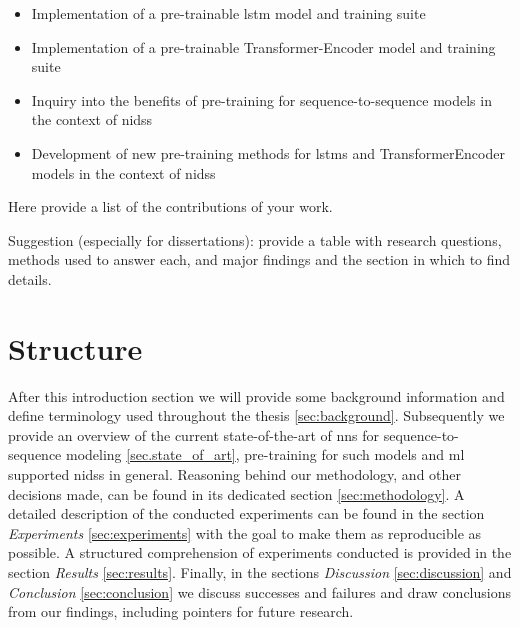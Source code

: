 \begin{itemize}
	\item Implementation of a pre-trainable \gls{lstm} model and training suite
	\item Implementation of a pre-trainable Transformer-Encoder model and training suite
	\item Inquiry into the benefits of pre-training for sequence-to-sequence models in the context of \glspl{nids}
	\item Development of new pre-training methods for \glspl{lstm} and TransformerEncoder models in the context of \glspl{nids}
\end{itemize}

Here provide a list of the contributions of your work.

Suggestion (especially for dissertations): provide a table with research questions, methods used to answer each, and major findings and the section in which to find details.

\section{Structure} \label{sect.structure}

After this introduction section we will provide some background information and define terminology used throughout the thesis \ref{sec:background}. Subsequently we provide an overview of the current state-of-the-art of \glspl{nn} for sequence-to-sequence modeling \ref{sec.state_of_art}, pre-training for such models and \gls{ml} supported \glspl{nids} in general. Reasoning behind our methodology, and other decisions made, can be found in its dedicated section \ref{sec:methodology}. A detailed description of the conducted experiments can 
be found in the section \textit{Experiments} \ref{sec:experiments} with the goal to make them as reproducible as possible. A structured comprehension of experiments conducted is provided in the section \textit{Results} \ref{sec:results}. Finally, in the sections \textit{Discussion} \ref{sec:discussion} and \textit{Conclusion} \ref{sec:conclusion} we discuss successes and failures and draw conclusions from our findings, including pointers for future research. 


\newpage